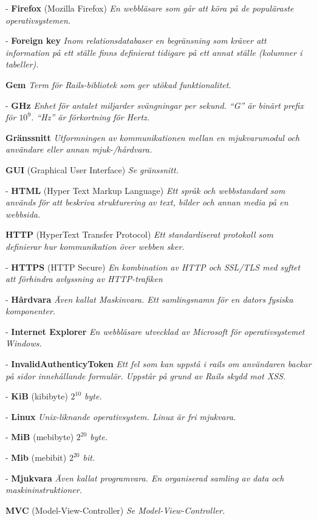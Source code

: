 \documentclass[a4paper, twoside, 11pt, titlepage]{article}
\begin{document}
	- \textbf{Firefox} (Mozilla Firefox) \emph{En webbläsare som går att köra på de populäraste operativsystemen.}

	- \textbf{Foreign key} \emph{Inom relationsdatabaser en begränsning som kräver att information på ett ställe finns definierat tidigare på ett annat ställe (kolumner i tabeller).}

	\textbf{Gem} \emph{Term för Rails-bibliotek som ger utökad funktionalitet.}

	- \textbf{GHz} \emph{Enhet för antalet miljarder svängningar per sekund. ``G'' är binärt prefix för $10^{9}$. ``Hz'' är förkortning för Hertz.}

	\textbf{Gränssnitt} \emph{Utformningen av kommunikationen mellan en mjukvarumodul och användare eller annan mjuk-/hårdvara.}

	\textbf{GUI} (Graphical User Interface) \emph{Se gränssnitt.}

	- \textbf{HTML} (Hyper Text Markup Language) \emph{Ett språk och webbstandard som används för att beskriva strukturering av text, bilder och annan media på en webbsida.}

	\textbf{HTTP} (HyperText Transfer Protocol) \emph{Ett standardiserat protokoll som definierar hur kommunikation över webben sker.}

	- \textbf{HTTPS} (HTTP Secure) \emph{En kombination av HTTP och SSL/TLS med syftet att förhindra avlyssning av HTTP-trafiken}

	- \textbf{Hårdvara} \emph{Även kallat Maskinvara. Ett samlingsnamn för en dators fysiska komponenter.}

	- \textbf{Internet Explorer} \emph{En webbläsare utvecklad av Microsoft för operativsystemet Windows.}

	- \textbf{InvalidAuthenticyToken} \emph{Ett fel som kan uppstå i rails om användaren backar på sidor innehållande formulär. Uppstår på grund av Rails skydd mot XSS.}

	- \textbf{KiB} (kibibyte) \emph{$2^{10}$ byte.}

	- \textbf{Linux} \emph{Unix-liknande operativsystem. Linux är fri mjukvara.}

	- \textbf{MiB} (mebibyte) \emph{$2^{20}$ byte.}

	- \textbf{Mib} (mebibit) \emph{$2^{20}$ bit.}

	- \textbf{Mjukvara} \emph{Även kallat programvara. En organiserad samling av data och maskininstruktioner.}

	\textbf{MVC} (Model-View-Controller) \emph{Se Model-View-Controller.}
\end{document}
